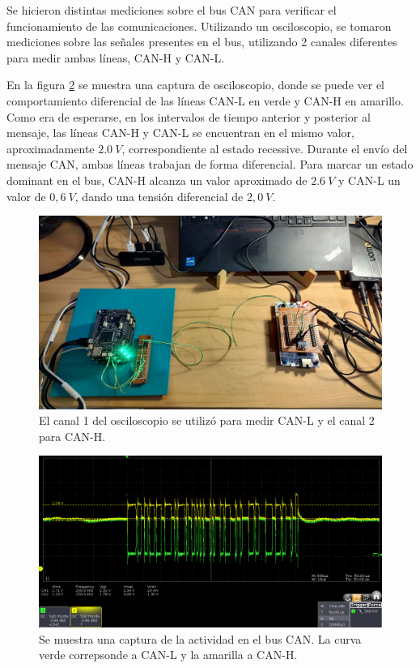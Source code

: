 Se hicieron distintas mediciones sobre el bus CAN para verificar el funcionamiento de las comunicaciones. Utilizando un osciloscopio, se tomaron mediciones sobre las señales presentes en el bus, utilizando 2 canales diferentes para medir ambas líneas, CAN-H y CAN-L. 

En la figura \ref{fig:mensaje_1_CANH} se muestra una captura de osciloscopio, donde se puede ver el comportamiento diferencial de las líneas CAN-L en verde y CAN-H en amarillo. Como era de esperarse, en los intervalos de tiempo anterior y posterior al mensaje, las líneas CAN-H y CAN-L se encuentran en el mismo valor, aproximadamente $2.0 \ V$, correspondiente al estado recessive. Durante el envío del mensaje CAN, ambas líneas trabajan de forma diferencial. Para marcar un estado dominant en el bus, CAN-H alcanza un valor aproximado de $2.6 \ V$ y CAN-L un valor de  $0,6 \ V$, dando una tensión diferencial de $2,0 \ V$.

\begin{figure}[!t]
    \centering
    \includegraphics[width=\textwidth]{img/placas_con_osciloscopio.jpeg}
    \caption{El canal 1 del osciloscopio se utilizó para medir CAN-L y el canal 2 para CAN-H.}
    \label{fig:placas_con_osciloscopio}
\end{figure}

\begin{figure}[!t]
    \centering
    \includegraphics[width=\textwidth]{img/mensaje_1_CANH.png}
    \caption{Se muestra una captura de la actividad en el bus CAN. La curva verde correpsonde a CAN-L y la amarilla a CAN-H.}
    \label{fig:mensaje_1_CANH}
\end{figure}

